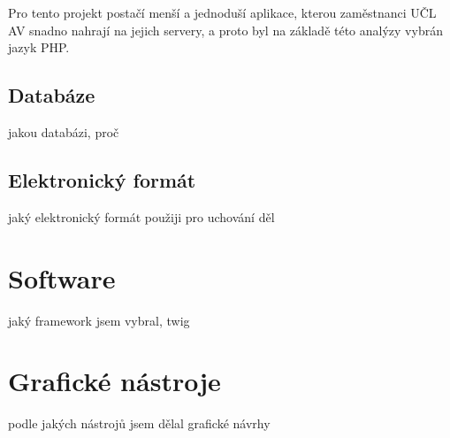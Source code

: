             Pro tento projekt postačí menší a jednoduší aplikace, kterou zaměstnanci UČL AV snadno nahrají na jejich servery, a proto byl na základě této analýzy vybrán jazyk PHP.
            
        \subsection{Databáze}
            jakou databázi, proč
        \subsection{Elektronický formát}
            jaký elektronický formát použiji pro uchování děl
    \section{Software}
        jaký framework jsem vybral, twig
    \section{Grafické nástroje}
        podle jakých nástrojů jsem dělal grafické návrhy
